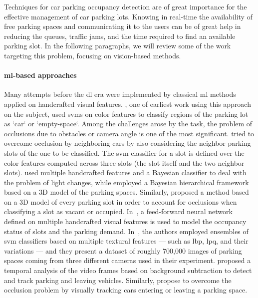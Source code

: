 Techniques for car parking occupancy detection are of great importance for the effective management of car parking lots.
Knowing in real-time the availability of free parking spaces and communicating it to the users can be of great help in reducing the queues, traffic jams, and the time required to find an available parking slot.
In the following paragraphs, we will review some of the work targeting this problem, focusing on vision-based methods.

\paragraph{\gls{ml}-based approaches}
Many attempts before the \gls{dl} era were implemented by classical \gls{ml} methods applied on handcrafted visual features.
\citet{dan2002parking}, one of earliest work using this approach on the subject, used \glspl{svm} on color features to classify regions of the parking lot as `car` or `empty-space`.
Among the challenges arose by the task, the problem of occlusions due to obstacles or camera angle is one of the most significant.
\citet{wu2007robust} tried to overcome occlusion by neighboring cars by also considering the neighbor parking slots of the one to be classified.
The \gls{svm} classifier for a slot is defined over the color features computed across three slots (the slot itself and the two neighbor slots).
\citet{tsai2007vehicle} used multiple handcrafted features and a Bayesian classifier to deal with the problem of light changes, while
\citet{huang2013vacant} employed a Bayesian hierarchical framework based on a 3D model of the parking spaces.
Similarly, \citet{delibaltov2013parking} proposed a method based on a 3D model of every parking slot in order to account for occlusions when classifying a slot as vacant or occupied.
In~\cite{jermsurawong2014one}, a feed-forward neural network defined on multiple handcrafted visual features is used to model the occupancy status of slots and the parking demand.
In~\cite{de2015pklot}, the authors employed ensembles of \gls{svm} classifiers based on multiple textural features --- such as \gls{lbp}, \gls{lpq}, and their variations --- and they present a dataset of roughly 700,000 images of parking spaces coming from three different cameras used in their experiment.
\citet{del2015vacant} proposed a temporal analysis of the video frames based on background subtraction to detect and track parking and leaving vehicles.
Similarly, \citet{masmoudi2014} propose to overcome the occlusion problem by visually tracking cars entering or leaving a parking space.

